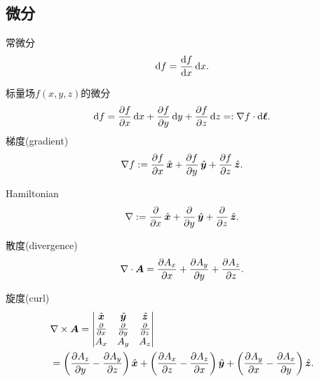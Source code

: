 \subsection{微分}
\begin{compactitem}
	\item 常微分
    \[
        \mathop{}\!\mathrm{d} f=\frac{\mathrm{d}^{\;\!\!}f}{\mathrm{d} x^{\;\!\!}}\mathop{}\!\mathrm{d} x.
    \]
	\item 标量场$f(x,y,z)$的微分
    \begin{align}
        \d f=\pv fx\d x+\pv fy\d y+\pv fz\d z=:\nabla f\cdot\d\bm\ell.
    \end{align}
    梯度(gradient)
    \begin{align}
        \nabla f:=\pv fx\uvec x+\pv fy\uvec y+\pv fz\uvec z.
    \end{align}
	\item Hamiltonian
	\begin{align}
        \nabla:=\pp x\uvec x+\pp y\uvec y+\pp z\uvec z.
    \end{align}
    \item 散度(divergence)
    \begin{align}
        \div\bm A=\pv{A_x}x+\pv{A_y}y+\pv{A_z}z.
    \end{align}
    \item 旋度(curl)
    \begin{align}\notag
        &\curl\bm A=\begin{vmatrix}
            \uvec x&\uvec y&\uvec z\\
            \pp x&\pp y&\pp z\\
            A_x&A_y&A_z
        \end{vmatrix}\\
        &=\biggkh{\pv{A_z}y-\pv{A_y}z}\uvec x+\biggkh{\pv{A_x}z-\pv{A_z}x}\uvec y+\biggkh{\pv{A_y}x-\pv{A_x}y}\uvec z.
    \end{align}
\end{compactitem}
